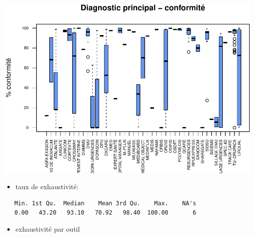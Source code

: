 \documentclass[]{article}
\providecommand{\tightlist}{%
  \setlength{\itemsep}{0pt}\setlength{\parskip}{0pt}}
\begin{document}
\includegraphics{septembre2015_files/figure-latex/unnamed-chunk-18-1.pdf}

\begin{itemize}
\tightlist
\item
  taux de exhaustivité:
\end{itemize}

\begin{verbatim}
   Min. 1st Qu.  Median    Mean 3rd Qu.    Max.    NA's 
   0.00   43.20   93.10   70.92   98.40  100.00       6 
\end{verbatim}

\begin{itemize}
\tightlist
\item
  exhaustivité par outil
\end{itemize}
\end{document}
